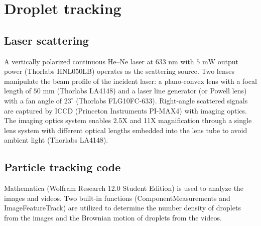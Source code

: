 
\chapter{Droplet tracking}
\label{sec:ap3}

\section{Laser scattering}
\label{sec:ap3-1}

A vertically polarized continuous He–Ne laser at $633 \text{ nm}$ with $5 \text{ mW}$ output power (Thorlabs HNL050LB) operates as the scattering source. Two lenses manipulate the beam profile of the incident laser: a plano-convex lens with a focal length of $50 \text{ mm}$ (Thorlabs LA4148) and a laser line generator (or Powell lens) with a fan angle of $23^{\circ}$ (Thorlabs FLG10FC-633). Right-angle scattered signals are captured by ICCD (Princeton Instruments PI-MAX4) with imaging optics. The imaging optics system enables 2.5X and 11X magnification through a single lens system with different optical lengths embedded into the lens tube to avoid ambient light (Thorlabs LA4148).

\section{Particle tracking code}
\label{sec:ap3-2}

Mathematica (Wolfram Research 12.0 Student Edition) is used to analyze the images and videos. Two built-in functions (ComponentMeasurements and ImageFeatureTrack) are utilized to determine the number density of droplets from the images and the Brownian motion of droplets from the videos.

